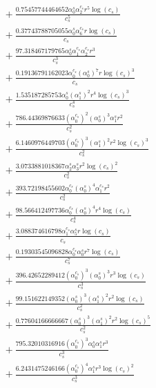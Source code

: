 \documentclass[10pt]{article}
\begin{document}
\begin{align*}
&{}  + \frac{0.75457744464652 \alpha_{0}^s \alpha_{2}^{c_s} r^{5} \log{\left(c_{s} \right)}}{c_{s}^{5}} \\
&{}  + \frac{0.37743788705055 \alpha_{0}^s \alpha_{6}^{c_s} r \log{\left(c_{s} \right)}}{c_{s}} \\
&{}  + \frac{97.318467179765 \alpha_{0}^s \alpha_{1}^{c_s} \alpha_{2}^{c_s} r^{3}}{c_{s}^{3}} \\
&{}  + \frac{0.19136791162023 \alpha_{0}^{c_s} \left(\alpha_{0}^s\right)^{7} r \log{\left(c_{s} \right)}^{3}}{c_{s}} \\
&{}  + \frac{1.535187285753 \alpha_{0}^s \left(\alpha_{1}^s\right)^{2} r^{4} \log{\left(c_{s} \right)}^{3}}{c_{s}^{4}} \\
&{}  + \frac{786.44369876633 \left(\alpha_{0}^{c_s}\right)^{2} \left(\alpha_{0}^s\right)^{3} \alpha_{1}^s r^{2}}{c_{s}^{2}} \\
&{}  + \frac{6.1460976449703 \left(\alpha_{0}^{c_s}\right)^{3} \left(\alpha_{1}^s\right)^{2} r^{2} \log{\left(c_{s} \right)}^{3}}{c_{s}^{2}} \\
&{}  + \frac{3.0733881018367 \alpha_{2}^s \alpha_{3}^s r^{2} \log{\left(c_{s} \right)}^{2}}{c_{s}^{2}} \\
&{}  + \frac{393.72198455602 \alpha_{0}^{c_s} \left(\alpha_{0}^s\right)^{4} \alpha_{1}^{c_s} r^{2}}{c_{s}^{2}} \\
&{}  + \frac{98.566412497736 \alpha_{0}^{c_s} \left(\alpha_{0}^s\right)^{4} r^{4} \log{\left(c_{s} \right)}}{c_{s}^{4}} \\
&{}  + \frac{3.088374616798 \alpha_{1}^{c_s} \alpha_{5}^s r \log{\left(c_{s} \right)}}{c_{s}} \\
&{}  + \frac{0.19303545096828 \alpha_{0}^{c_s} \alpha_{0}^s r^{7} \log{\left(c_{s} \right)}}{c_{s}^{7}} \\
&{}  + \frac{396.42652289412 \left(\alpha_{0}^{c_s}\right)^{3} \left(\alpha_{0}^s\right)^{3} r^{3} \log{\left(c_{s} \right)}}{c_{s}^{3}} \\
&{}  + \frac{99.151622149352 \left(\alpha_{0}^s\right)^{3} \left(\alpha_{1}^s\right)^{2} r^{2} \log{\left(c_{s} \right)}}{c_{s}^{2}} \\
&{}  + \frac{0.77604166666667 \left(\alpha_{0}^s\right)^{3} \left(\alpha_{1}^s\right)^{2} r^{2} \log{\left(c_{s} \right)}^{5}}{c_{s}^{2}} \\
&{}  + \frac{795.32010316916 \left(\alpha_{0}^{c_s}\right)^{3} \alpha_{0}^s \alpha_{1}^s r^{3}}{c_{s}^{3}} \\
&{}  + \frac{6.2431475246166 \left(\alpha_{0}^{c_s}\right)^{4} \alpha_{1}^s r^{3} \log{\left(c_{s} \right)}^{2}}{c_{s}^{3}} \\

\end{align*}
\end{document}
